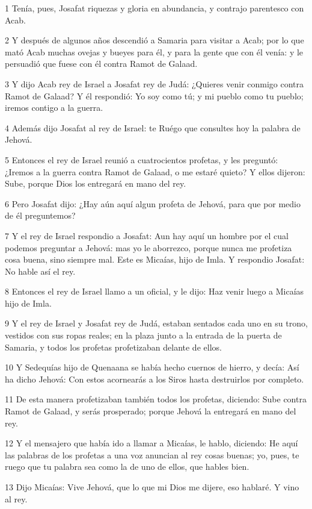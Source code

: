 \par 1 Tenía, pues, Josafat riquezas y gloria en abundancia, y contrajo parentesco con Acab.
\par 2 Y después de algunos años descendió a Samaria para visitar a Acab; por lo que mató Acab muchas ovejas y bueyes para él, y para la gente que con él venía: y le persuadió que fuese con él contra Ramot de Galaad.
\par 3 Y dijo Acab rey de Israel a Josafat rey de Judá: ¿Quieres venir conmigo contra Ramot de Galaad? Y él respondió: Yo soy como tú; y mi pueblo como tu pueblo; iremos contigo a la guerra.
\par 4 Además dijo Josafat al rey de Israel: te Ruégo que consultes hoy la palabra de Jehová.
\par 5 Entonces el rey de Israel reunió a cuatrocientos profetas, y les preguntó: ¿Iremos a la guerra contra Ramot de Galaad, o me estaré quieto? Y ellos dijeron: Sube, porque Dios los entregará en mano del rey.
\par 6 Pero Josafat dijo: ¿Hay aún aquí algun profeta de Jehová, para que por medio de él preguntemos?
\par 7 Y el rey de Israel respondio a Josafat: Aun hay aquí un hombre por el cual podemos preguntar a Jehová: mas yo le aborrezco, porque nunca me profetiza cosa buena, sino siempre mal. Este es Micaías, hijo de Imla. Y respondio Josafat: No hable así el rey.
\par 8 Entonces el rey de Israel llamo a un oficial, y le dijo: Haz venir luego a Micaías hijo de Imla.
\par 9 Y el rey de Israel y Josafat rey de Judá, estaban sentados cada uno en su trono, vestidos con sus ropas reales; en la plaza junto a la entrada de la puerta de Samaria, y todos los profetas profetizaban delante de ellos.
\par 10 Y Sedequías hijo de Quenaana se había hecho cuernos de hierro, y decía: Así ha dicho Jehová: Con estos acornearás a los Siros hasta destruirlos por completo.
\par 11 De esta manera profetizaban también todos los profetas, diciendo: Sube contra Ramot de Galaad, y serás prosperado; porque Jehová la entregará en mano del rey.
\par 12 Y el mensajero que había ido a llamar a Micaías, le hablo, diciendo: He aquí las palabras de los profetas a una voz anuncian al rey cosas buenas; yo, pues, te ruego que tu palabra sea como la de uno de ellos, que hables bien.
\par 13 Dijo Micaías: Vive Jehová, que lo que mi Dios me dijere, eso hablaré. Y vino al rey. 
